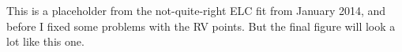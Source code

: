 This is a placeholder from the not-quite-right ELC fit from January 2014, and before I fixed some problems with the RV points. But the final figure will look a lot like this one.